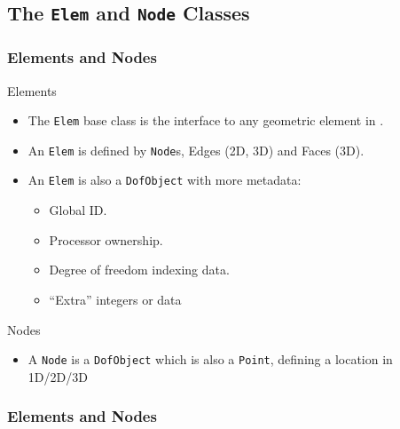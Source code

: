 \subsection{The \texttt{Elem} and \texttt{Node} Classes}
\begin{frame}
  \frametitle{Elements and Nodes}
  \begin{block}{Elements}
    \begin{itemize}
      \item The \texttt{Elem} base class is the interface to any geometric element in \libMesh{}.
      \item An \texttt{Elem} is defined by \texttt{Node}s, Edges (2D, 3D) and Faces (3D).
      \item An \texttt{Elem} is also a \texttt{DofObject} with
        more metadata:
        \begin{itemize}
          \item Global ID.
          \item Processor ownership.
          \item Degree of freedom indexing data.
          \item ``Extra'' integers or data
        \end{itemize}
    \end{itemize}
  \end{block}
  \begin{block}{Nodes}
    \begin{itemize}
      \item A \texttt{Node} is a \texttt{DofObject} which is also a
        \texttt{Point}, defining a location in 1D/2D/3D
    \end{itemize}
  \end{block}

\end{frame}

\begin{frame}[shrink]
  \frametitle{Elements and Nodes}
  
\end{frame}

